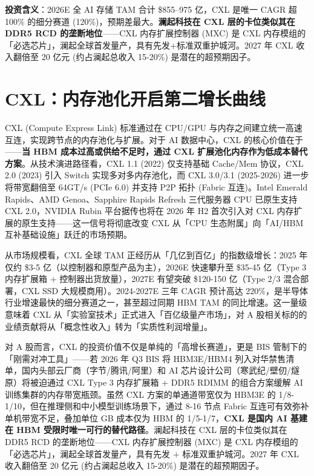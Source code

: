 \vspace{0.4em}
\noindent\textbf{投资含义}：2026E 全 AI 存储 TAM 合计 \$855--975 亿，CXL 是唯一 CAGR 超 100\% 的细分赛道 (120\%)，预期差最大。\textbf{澜起科技在 CXL 层的卡位类似其在 DDR5 RCD 的垄断地位}——CXL 内存扩展控制器 (MXC) 是 CXL 内存模组的「必选芯片」，澜起全球首发量产，具有先发+标准双重护城河。2027 年 CXL 收入翻倍至 20 亿元 (约占澜起总收入 15-20\%) 是潜在的超预期因子。

\section{CXL：内存池化开启第二增长曲线}

CXL (Compute Express Link) 标准通过在 CPU/GPU 与内存之间建立统一高速互连，实现跨节点的内存池化与扩展。对于 AI 数据中心，CXL 的核心价值在于——\textbf{当 HBM 成本过高或供给不足时，通过 CXL 扩展池化内存作为低成本替代方案}。从技术演进路径看，CXL 1.1 (2022) 仅支持基础 Cache/Mem 协议，CXL 2.0 (2023) 引入 Switch 实现多对多内存池化，而 CXL 3.0/3.1 (2025-2026) 进一步将带宽翻倍至 64GT/s (PCIe 6.0) 并支持 P2P 拓扑 (Fabric 互连)。Intel Emerald Rapids、AMD Genoa、Sapphire Rapids Refresh 三代服务器 CPU 已原生支持 CXL 2.0，NVIDIA Rubin 平台据传也将在 2026 年 H2 首次引入对 CXL 内存扩展的原生支持——这一信号将彻底改变 CXL 从「CPU 生态附属」向「AI/HBM 互补基础设施」跃迁的市场预期。

从市场规模看，CXL 全球 TAM 正经历从「几亿到百亿」的指数级增长：2025 年仅约 \$3-5 亿（以控制器和原型产品为主），2026E 快速攀升至 \$35-45 亿（Type 3 内存扩展箱 + 控制器出货放量），2027E 有望突破 \$120-150 亿（Type 2/3 混合部署，CXL SSD 大规模商用）。2024-2027E 三年 CAGR 预计高达 220\%，是半导体行业增速最快的细分赛道之一，甚至超过同期 HBM TAM 的同比增速。这一量级意味着 CXL 从「实验室技术」正式进入「百亿级量产市场」，对 A 股相关标的的业绩贡献将从「概念性收入」转为「实质性利润增量」。

对 A 股而言，CXL 的投资价值不仅是单纯的「高增长赛道」，更是 BIS 管制下的「刚需对冲工具」——若 2026 年 Q3 BIS 将 HBM3E/HBM4 列入对华禁售清单，国内头部云厂商（字节/腾讯/阿里）和 AI 芯片设计公司（寒武纪/壁仞/燧原）将被迫通过 CXL Type 3 内存扩展箱 + DDR5 RDIMM 的组合方案缓解 AI 训练集群的内存带宽瓶颈。虽然 CXL 方案的单通道带宽仅为 HBM3E 的 1/8-1/10，但在推理侧和中小模型训练场景下，通过 8-16 节点 Fabric 互连可有效弥补单机带宽不足，叠加单位 GB 成本仅为 HBM 的 1/5-1/7，\textbf{CXL 是国内 AI 基建在 HBM 受限时唯一可行的替代路径}。澜起科技在 CXL 层的卡位类似其在 DDR5 RCD 的垄断地位——CXL 内存扩展控制器 (MXC) 是 CXL 内存模组的「必选芯片」，澜起全球首发量产，具有先发 + 标准双重护城河。2027 年 CXL 收入翻倍至 20 亿元 (约占澜起总收入 15-20\%) 是潜在的超预期因子。

